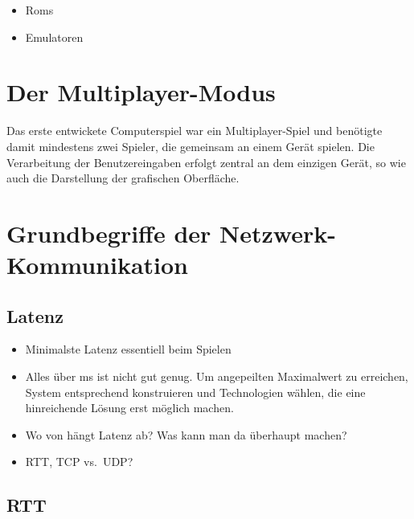 \begin{itemize}
\tightlist
\item
  Roms
\item
  Emulatoren
\end{itemize}

\section{Der Multiplayer-Modus}\label{der-multiplayer-modus}


Das erste entwickete Computerspiel war ein Multiplayer-Spiel und
benötigte damit mindestens zwei Spieler, die gemeinsam an einem Gerät
spielen. Die Verarbeitung der Benutzereingaben erfolgt zentral an dem
einzigen Gerät, so wie auch die Darstellung der grafischen Oberfläche.

\section{Grundbegriffe der
Netzwerk-Kommunikation}\label{grundbegriffe-der-netzwerk-kommunikation}


\subsection{Latenz}\label{latenz}

\begin{itemize}
\tightlist
\item
  Minimalste Latenz essentiell beim Spielen
\item
  Alles über \unit[N]{ms} ist nicht gut genug. Um angepeilten
  Maximalwert zu erreichen, System entsprechend konstruieren und
  Technologien wählen, die eine hinreichende Lösung erst möglich machen.
\item
  Wo von hängt Latenz ab? Was kann man da überhaupt machen?
\item
  RTT, TCP vs.~UDP?
\end{itemize}

\subsection{RTT}\label{rtt}

